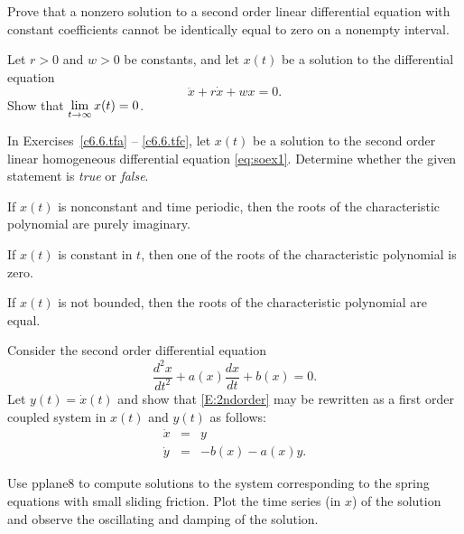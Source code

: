 \documentclass{ximera}
\begin{document}
\begin{exercise} \label{c6.7.3}
Prove that a nonzero solution to a second order linear differential equation
with constant coefficients cannot be identically equal to zero on a nonempty
interval.
\end{exercise}

\begin{exercise} \label{c6.7.4}
Let $r>0$ and $w>0$ be constants, and let $x(t)$ be a solution to the
differential equation
\[
\ddot{x} + r\dot{x} + wx = 0.
\]
Show that $\displaystyle\lim_{t\to\infty} x(t) = 0$.
\end{exercise}

\noindent In Exercises~\ref{c6.6.tfa} -- \ref{c6.6.tfc}, let $x(t)$ be a
solution to the second order linear homogeneous differential equation
\eqref{eq:soex1}.  Determine whether the given statement is {\em true\/}
or {\em false}.
\begin{exercise} \label{c6.6.tfa}
If $x(t)$ is nonconstant and time periodic, then the
roots of the characteristic polynomial are purely imaginary.
\end{exercise}
\begin{exercise} \label{c6.6.tfb}
If $x(t)$ is constant in $t$, then one of the roots of
the characteristic polynomial is zero.
\end{exercise}
\begin{exercise} \label{c6.6.tfc}
If $x(t)$ is not bounded, then the roots of the characteristic
polynomial are equal.
\end{exercise}

\begin{exercise} \label{c3.5.5}
Consider the second order differential equation
\begin{equation}  \label{E:2ndorder}
\frac{d^2x}{dt^2} + a(x)\frac{dx}{dt} + b(x) = 0.
\end{equation}
Let $y(t)=\dot{x}(t)$ and show that \eqref{E:2ndorder} may be
rewritten as a first order coupled system in $x(t)$ and $y(t)$
as follows:
\begin{eqnarray*}
\dot{x} & = & y \\
\dot{y} & = & -b(x) - a(x) y.
\end{eqnarray*}
\end{exercise}


\CEXER

\begin{exercise} \label{c6.7.5}
Use {\sf pplane8} to compute solutions to the system corresponding to the
spring equations with small sliding friction.  Plot the time series (in $x$)
of the solution and observe the oscillating and damping of the solution.
\end{exercise}
\end{document}
